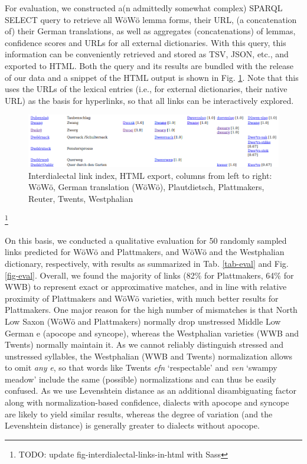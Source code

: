 \documentclass[11pt]{article}
\newcommand{\word}[1]{\textsl{#1}} %
\newcommand{\todo}[1]{\footnote{\huge{TODO:} #1}}     %
\begin{document}
For evaluation, we constructed a(n admittedly somewhat complex) SPARQL SELECT query to retrieve all WöWö lemma forms, their URL, (a concatenation of) their German translations, as well as aggregates (concatenations) of lemmas, confidence scores and URLs for all external dictionaries. With this query, this information can be conveniently retrieved and stored as TSV, JSON, etc., and exported to HTML. Both the query and its results are bundled with the release of our data and a snippet of the HTML output is shown in Fig. \ref{fig-interdialectal-links-in-html}. Note that this uses the URLs of the lexical entries (i.e., for external dictionaries, their native URL) as the basis for hyperlinks, so that all links can be interactively explored.


\begin{figure}
    \centering
    \includegraphics[width=1\linewidth]{img/html.png}
    \caption{Interdialectal link index, HTML export, columns from left to right: WöWö, German translation (WöWö), Plautdietsch, Plattmakers, Reuter, Twents, Westphalian}
    \label{fig-interdialectal-links-in-html}
\end{figure}

\todo{update fig-interdialectal-links-in-html with Sass}

On this basis, we conducted a qualitative evaluation for 50 randomly sampled links predicted for WöWö and Plattmakers, and WöWö and the Westphalian dictionary, respectively, with results as summarized in Tab. \ref{tab-eval} and Fig. \ref{fig-eval}. 
Overall, we found the majority of links (82\% for Plattmakers, 64\% for WWB) to represent exact or approximative matches, and in line with relative proximity of Plattmakers and WöWö varieties, with much better results for Plattmakers. One major reason for the high number of mismatches is that North Low Saxon (WöWö and Plattmakers) normally drop unstressed Middle Low German e (apocope and syncope), whereas the Westphalian varieties (WWB and Twents) normally maintain it. 
As we cannot reliably distinguish stressed and unstressed syllables, the Westphalian (WWB and Twents) normalization allows to omit \emph{any} \word{e}, so that words like Twents \word{efn} `respectable' and \word{ven} `swampy meadow' include the same (possible) normalizations and can thus be easily confused. As we use Levenshtein distance as an additional disambiguating factor along with normalization-based confidence, dialects with apocope and syncope are likely to yield similar results, whereas the degree of variation (and the Levenshtein distance) is generally greater to dialects without apocope.
\end{document}
